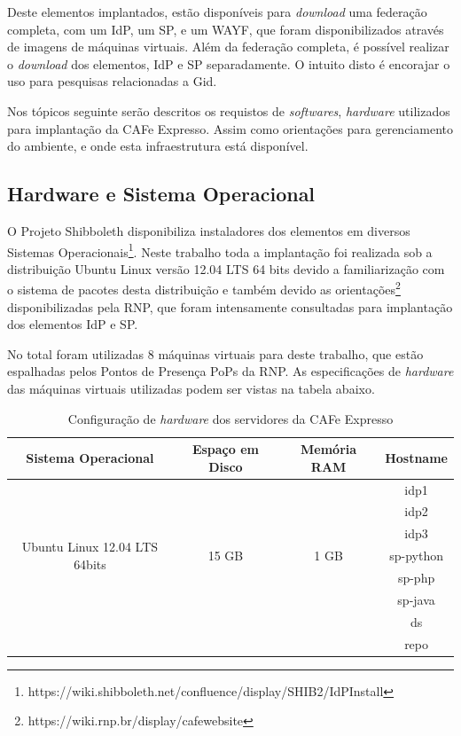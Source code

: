 Deste elementos implantados, estão disponíveis para \textit{download} uma federação completa, com um IdP, um SP, e um WAYF, que foram disponibilizados através de imagens de máquinas virtuais. Além da federação completa, é possível realizar o \textit{download} dos elementos, IdP e SP separadamente. O intuito disto é encorajar o uso para pesquisas relacionadas a Gid.

Nos tópicos seguinte serão descritos os requistos de \textit{softwares}, \textit{hardware} utilizados para implantação da CAFe Expresso. Assim como orientações para gerenciamento do ambiente, e onde esta infraestrutura está disponível.

\subsection{Hardware e Sistema Operacional}
\label{ss_c4_so}

O Projeto Shibboleth disponibiliza instaladores dos elementos em diversos Sistemas Operacionais\footnote{https://wiki.shibboleth.net/confluence/display/SHIB2/IdPInstall}. Neste trabalho toda a implantação foi realizada sob a distribuição Ubuntu Linux versão 12.04 LTS 64 bits devido a familiarização com o sistema de pacotes desta distribuição e também devido as orientações\footnote{https://wiki.rnp.br/display/cafewebsite} disponibilizadas pela RNP, que foram intensamente consultadas para implantação dos elementos IdP e SP. 

No total foram utilizadas 8 máquinas virtuais para deste trabalho, que estão espalhadas pelos Pontos de Presença PoPs da RNP. As especificações de \textit{hardware} das máquinas virtuais utilizadas podem ser vistas na tabela abaixo. 

\begin{table}[!htpb]
   \begin{small}
	\centering
	\begin{tabular}{|c|c|c|c|} \hline
		Sistema Operacional & Espaço em Disco & Memória RAM & Hostname\\ \hline
		\multirow{7}{*}{Ubuntu Linux 12.04 LTS 64bits} & \multirow{7}{*}{15 GB} & \multirow{7}{*}{1 GB} & idp1\\
		& & & idp2\\
		& & & idp3\\
		& & & sp-python\\
		& & & sp-php\\
		& & & sp-java\\
		& & & ds\\
		& & & repo\\ \hline
	\end{tabular}
	\caption{Configuração de \textit{hardware} dos servidores da CAFe Expresso}
	\label{t_fixa}
  \end{small}
\end{table}

